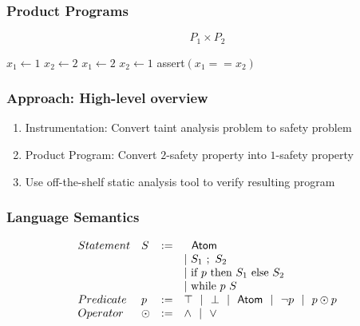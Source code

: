 \documentclass{beamer} %
\theoremstyle{definition} %
\begin{document}
        \begin{frame}
            \frametitle{Product Programs}   
            $$P_1\times P_2$$

        \begin{center}
            \begin{algorithm}[H]
                \begin{algorithmic}
                        \State $x_1 \gets 1$
                        \State $x_2 \gets 2$
                    \Else
                        \State $x_1 \gets 2$
                        \State $x_2 \gets 1$
                    \EndIf
                    \State \textsf{assert}$(x_1 == x_2)$
                \end{algorithmic}
            \end{algorithm}
        \end{center}
            
            \end{frame}

\begin{frame}
\frametitle{Approach: High-level overview}

	\begin{enumerate}
		\item Instrumentation: Convert taint analysis problem to safety problem
		\item Product Program: Convert $2$-safety property into $1$-safety property
		\item Use off-the-shelf static analysis tool to verify resulting program
	\end{enumerate}

\end{frame}

\begin{frame}
    \frametitle{Language Semantics}
    
        \[
            \begin{array}{l l c l}
                Statement & S & := & 
                    \ \ \mathsf{Atom} \\
                    & & & |~ S_1\ ;\ S_2 \\
                    & & & |~ \text{if }p\text{ then } S_1 \text{ else } S_2 \\
                    & & & |~ \text{while }p\text{ } S \\
                Predicate & p &:=& \top ~~|~~ \bot ~~|~~ \mathsf{Atom} ~~|~~ \lnot p ~~|~~ p \odot p \\
                Operator & \odot &:=& \land ~~|~~ \lor \\
            \end{array}
        \]
    
    
    \end{frame}
\end{document}
